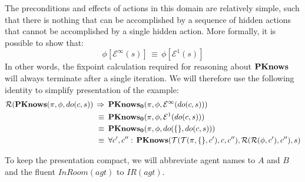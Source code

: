 The preconditions and effects of actions in this domain are relatively
simple, such that there is nothing that can be accomplished by a sequence
of hidden actions that cannot be accomplished by a single hidden action.
More formally, it is possible to show that:\[
\phi[\mathcal{E}^{\infty}(s)]\,\equiv\,\phi[\mathcal{E}^{1}(s)]\]
 In other words, the fixpoint calculation required for reasoning about
$\mathbf{PKnows}$ will always terminate after a single iteration. We will
therefore use the following identity to simplify presentation of the
example:\begin{align*}
\mathcal{R}(\mathbf{PKnows}(\pi,\phi,do(c,s))\,\Rightarrow & \,\,\,\mathbf{PKnows_{0}}(\pi,\phi,\mathcal{E}^{\infty}(do(c,s)))\\
\equiv & \,\,\,\mathbf{PKnows_{0}}(\pi,\phi,\mathcal{E}^{1}(do(c,s)))\\
\equiv & \,\,\,\mathbf{PKnows_{0}}(\pi,\phi,do(\{\},do(c,s)))\\
\equiv & \,\,\,\forall c',c'':\,\mathbf{PKnows}(\mathcal{T}(\mathcal{T}(\pi,\{\},c'),c,c''),\mathcal{R}(\mathcal{R}(\phi,c'),c''),s)\end{align*}


To keep the presentation compact, we will abbreviate agent names to
$A$ and $B$ and the fluent $InRoom(agt)$ to $IR(agt)$.

\newpage{}

